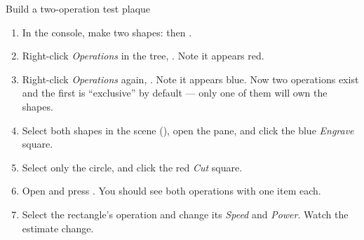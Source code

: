 \begin{tryit}{Build a two-operation test plaque}
\begin{enumerate}[label=\arabic*.,leftmargin=1.4em]
  \item In the console, make two shapes:
         then .
  \item Right-click \emph{Operations} in the tree, . Note it appears red.
  \item Right-click \emph{Operations} again, . Note it appears blue. Now two operations exist and the first is
        ``exclusive'' by default --- only one of them will own the shapes.
  \item Select both shapes in the scene (), open the
         pane, and click the blue \emph{Engrave} square.
  \item Select only the circle, and click the red \emph{Cut} square.
  \item Open  and press .
        You should see both operations with one item each.
  \item Select the rectangle's operation and change its \emph{Speed} and
        \emph{Power}. Watch the estimate change.
\end{enumerate}
\end{tryit}

